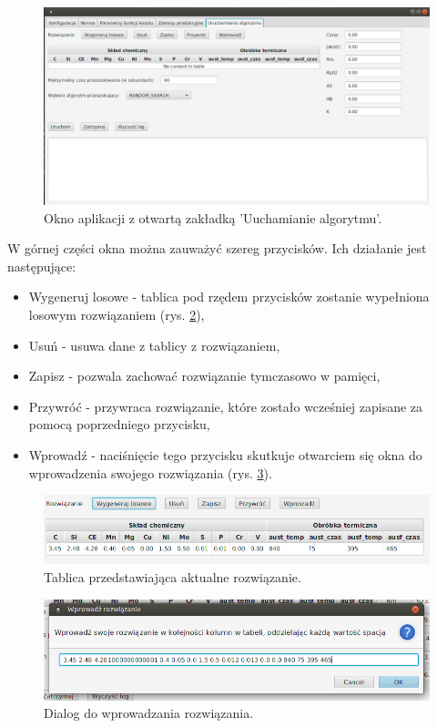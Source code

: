 \begin{figure}[ht]{}
	\centering
	\includegraphics[scale=0.48]{images/initial_state.png}
	\caption {
		 Okno aplikacji z otwartą zakładką 'Uuchamianie algorytmu'.
	}
	\label{fig:initial-state}
\end{figure}

W górnej części okna można zauważyć szereg przycisków. Ich działanie jest następujące:
\begin{itemize}
    \item Wygeneruj losowe - tablica pod rzędem przycisków zostanie wypełniona losowym rozwiązaniem (rys. \ref{fig:random_solution}),
    \item Usuń - usuwa dane z tablicy z rozwiązaniem,
    \item Zapisz - pozwala zachować rozwiązanie tymczasowo w pamięci,
    \item Przywróć - przywraca rozwiązanie, które zostało wcześniej zapisane za pomocą poprzedniego przycisku,
    \item Wprowadź - naciśnięcie tego przycisku skutkuje otwarciem się okna do wprowadzenia swojego rozwiązania (rys. \ref{fig:input}).
    
\end{itemize}

\begin{figure}[ht]{}
	\centering
	\includegraphics[scale=0.6]{images/random_solution.png}
	\caption {
		 Tablica przedstawiająca aktualne rozwiązanie.
	}
	\label{fig:random_solution}
\end{figure}

\begin{figure}[ht]{}
	\centering
	\includegraphics[scale=0.6]{images/input.png}
	\caption {
		 Dialog do wprowadzania rozwiązania.
	}
	\label{fig:input}
\end{figure}


